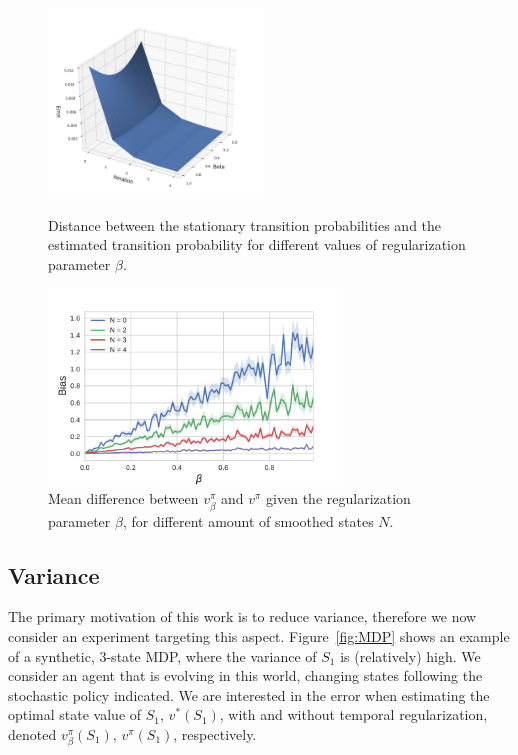 \documentclass{article}
\newcommand{\param}{\beta}
\newcommand{\V}{v}
\newcommand{\Vr}{\V_{\param}}
\begin{document}
\begin{figure}
\begin{minipage}[c]{0.45\linewidth}
\includegraphics[height=5cm,width=\linewidth]{Markov_mixing.pdf}
\caption{Distance between the stationary transition probabilities and the estimated transition probability for different values of regularization parameter $\param$.}
\label{fig:mixing}
\end{minipage}
\hfill
\begin{minipage}[c]{0.45\linewidth}
\includegraphics[height=5.2cm,width=\linewidth]{Bias_N.pdf}
\caption{Mean difference between $\Vr^{\pi}$ and $\V^{\pi}$ given the regularization parameter $\param$, for different amount of smoothed states $N$.}
\label{fig:mod}
\end{minipage}
\end{figure}

\subsection{Variance}
\label{sec:expe:variance}
The primary motivation of this work is to reduce variance, therefore we now consider an experiment  targeting this aspect. Figure~\ref{fig:MDP} shows an example of a synthetic, 3-state MDP, where the variance of $S_1$ is (relatively) high. We consider an agent that is evolving in this world, changing states following the stochastic policy indicated. We are interested in the error when estimating the optimal state value of $S_1$, $\V^*(S_1)$, with and without temporal regularization, denoted $\Vr^{\pi}(S_1)$, $\V^{\pi}(S_1)$, respectively.
\end{document}
